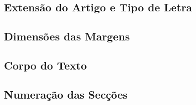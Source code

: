 \documentclass[9pt,a4paper]{extarticle}
\begin{document}
\begin{multicols}{2}
\subsection{Extensão do Artigo e Tipo de Letra}



\subsection{Dimensões das Margens}



\subsection{Corpo do Texto}


\subsection{Numeração das Secções}


\end{multicols}
\end{document}
